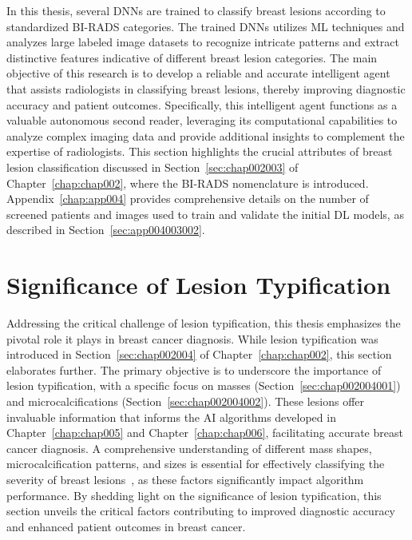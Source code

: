 In this thesis, several \acp{DNN} are trained to classify breast lesions according to standardized \ac{BI-RADS} categories.
The trained \acp{DNN} utilizes \ac{ML} techniques and analyzes large labeled image datasets to recognize intricate patterns and extract distinctive features indicative of different breast lesion categories.
The main objective of this research is to develop a reliable and accurate intelligent agent that assists radiologists in classifying breast lesions, thereby improving diagnostic accuracy and patient outcomes.
Specifically, this intelligent agent functions as a valuable autonomous second reader, leveraging its computational capabilities to analyze complex imaging data and provide additional insights to complement the expertise of radiologists.
This section highlights the crucial attributes of breast lesion classification discussed in Section~\ref{sec:chap002003} of Chapter~\ref{chap:chap002}, where the \ac{BI-RADS} nomenclature is introduced.
Appendix~\ref{chap:app004} provides comprehensive details on the number of screened patients and images used to train and validate the initial \ac{DL} models, as described in Section~\ref{sec:app004003002}.

\section{Significance of Lesion Typification}
\label{sec:app001004}

Addressing the critical challenge of lesion typification, this thesis emphasizes the pivotal role it plays in breast cancer diagnosis.
While lesion typification was introduced in Section~\ref{sec:chap002004} of Chapter~\ref{chap:chap002}, this section elaborates further.
The primary objective is to underscore the importance of lesion typification, with a specific focus on masses (Section~\ref{sec:chap002004001}) and microcalcifications (Section~\ref{sec:chap002004002}).
These lesions offer invaluable information that informs the \ac{AI} algorithms developed in Chapter~\ref{chap:chap005} and Chapter~\ref{chap:chap006}, facilitating accurate breast cancer diagnosis.
A comprehensive understanding of different mass shapes, microcalcification patterns, and sizes is essential for effectively classifying the severity of breast lesions~\cite{8611096, 9231684}, as these factors significantly impact algorithm performance.
By shedding light on the significance of lesion typification, this section unveils the critical factors contributing to improved diagnostic accuracy and enhanced patient outcomes in breast cancer.

